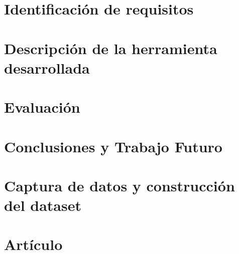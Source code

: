 \documentclass[11pt,a4paper,spanish]{book}
\begin{document}
\chapter{Identificación de requisitos}


\chapter{Descripción de la herramienta desarrollada}


\chapter{Evaluación}


\chapter{Conclusiones y Trabajo Futuro}


%




\appendix

\chapter{Captura de datos y construcción del dataset}


\chapter{Artículo}

\newpage
\end{document}
